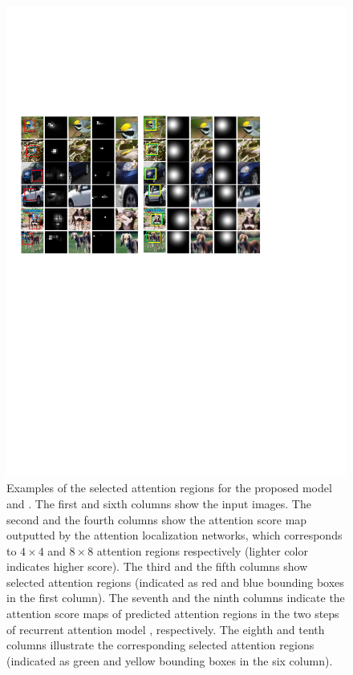 \documentclass[runningheads]{llncs}
\begin{document}
\begin{figure}[!t]
\begin{center}
\includegraphics[scale = 0.5]{3.pdf}
\end{center}
\caption{Examples of the selected attention regions for the proposed model and  \cite{bd3}.
The first and sixth columns show the input images.
The second and the fourth columns show the attention score map outputted by the attention localization networks, which corresponds to $4\times4$ and $8\times8$ attention regions respectively (lighter color indicates higher score).
The third and the fifth columns show selected attention regions (indicated as red and blue bounding boxes in the first column).
The seventh and the ninth columns indicate the attention score maps of predicted attention regions in the two steps of recurrent attention model \cite{bd3}, respectively.
The eighth and tenth columns illustrate the corresponding selected attention regions (indicated as green and yellow bounding boxes in the six column).
}\label{fig:attention_illustration}
\vspace{-8pt}
\end{figure}
\end{document}
